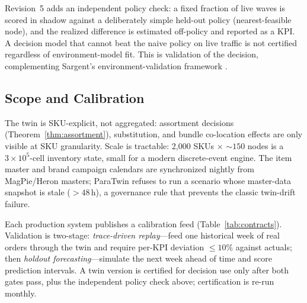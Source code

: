 Revision~5 adds an independent policy check: a fixed fraction of live waves is scored in shadow against a deliberately simple held-out policy (nearest-feasible node), and the realized difference is estimated off-policy \cite{li2011} and reported as a KPI. A decision model that cannot beat the naive policy on live traffic is not certified regardless of environment-model fit. This is validation of the decision, complementing Sargent's environment-validation framework \cite{sargent2013}.

\subsection{Scope and Calibration}
The twin is SKU-explicit, not aggregated: assortment decisions (Theorem~\ref{thm:assortment}), substitution, and bundle co-location effects are only visible at SKU granularity. Scale is tractable: 2,000 SKUs $\times$ ${\sim}150$ nodes is a $3\times10^5$-cell inventory state, small for a modern discrete-event engine. The item master and brand campaign calendars are synchronized nightly from MagPie/Heron masters; ParaTwin refuses to run a scenario whose master-data snapshot is stale ($>48$\,h), a governance rule that prevents the classic twin-drift failure.

Each production system publishes a calibration feed (Table~\ref{tab:contracts}). Validation is two-stage: \emph{trace-driven replay}---feed one historical week of real orders through the twin and require per-KPI deviation $\le10\%$ against actuals; then \emph{holdout forecasting}---simulate the next week ahead of time and score prediction intervals. A twin version is certified for decision use only after both gates pass, plus the independent policy check above; certification is re-run monthly.

